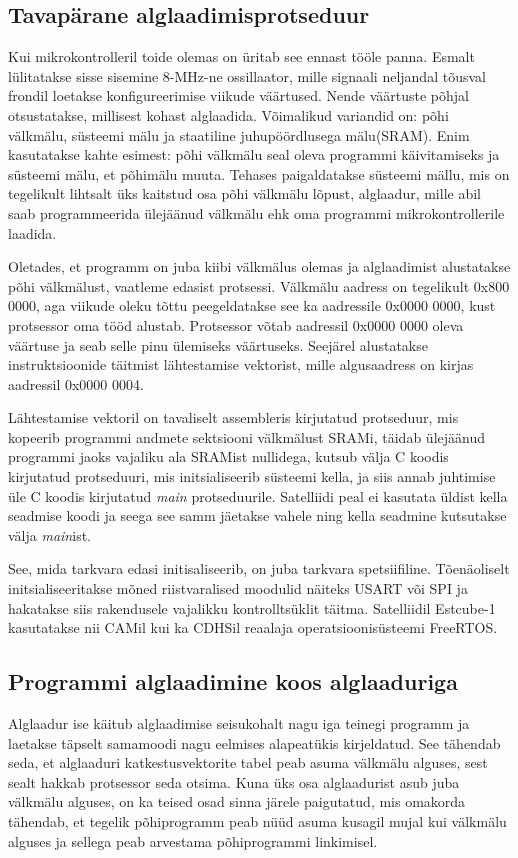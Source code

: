 \documentclass[12pt,a4paper]{article}
\begin{document}
\subsection{Tavapärane alglaadimisprotseduur}
Kui mikrokontrolleril toide olemas on üritab see ennast tööle panna.
Esmalt lülitatakse sisse sisemine 8-MHz-ne ossillaator, mille signaali
neljandal tõusval frondil loetakse konfigureerimise viikude väärtused. Nende
väärtuste põhjal otsustatakse, millisest kohast alglaadida. Võimalikud
variandid on: põhi välkmälu, süsteemi mälu ja staatiline juhupöördlusega
mälu(SRAM).  Enim kasutatakse kahte esimest: põhi välkmälu seal oleva programmi
käivitamiseks ja süsteemi mälu, et põhimälu muuta. Tehases paigaldatakse
süsteemi mällu, mis on tegelikult lihtsalt üks kaitstud osa põhi välkmälu
lõpust, alglaadur, mille abil saab programmeerida ülejäänud välkmälu ehk oma
programmi mikrokontrollerile laadida.

Oletades, et programm on juba kiibi välkmälus olemas ja alglaadimist
alustatakse põhi välkmälust, vaatleme edasist protsessi. Välkmälu aadress on
tegelikult 0x800 0000, aga viikude oleku tõttu peegeldatakse see ka aadressile
0x0000 0000, kust protsessor oma tööd alustab.  Protsessor võtab aadressil
0x0000 0000 oleva väärtuse ja seab selle pinu ülemiseks väärtuseks. Seejärel
alustatakse instruktsioonide täitmist lähtestamise vektorist, mille
algusaadress on kirjas aadressil 0x0000 0004. \cite{f1rm}

Lähtestamise vektoril on tavaliselt assembleris kirjutatud protseduur, mis
kopeerib programmi andmete sektsiooni välkmälust SRAMi, täidab ülejäänud
programmi jaoks vajaliku ala SRAMist nullidega, kutsub välja C koodis kirjutatud
protseduuri, mis initsialiseerib süsteemi kella, ja siis annab juhtimise üle C
koodis kirjutatud \textit{main} protseduurile. Satelliidi peal ei kasutata
üldist kella seadmise koodi ja seega see samm jäetakse vahele ning kella
seadmine kutsutakse välja \textit{main}ist.

See, mida tarkvara edasi initisaliseerib, on juba tarkvara spetsiifiline.
Tõenäoliselt initsialiseeritakse mõned riistvaralised moodulid näiteks USART või
SPI ja hakatakse siis rakendusele vajalikku kontrolltsüklit täitma. Satelliidil
Estcube-1 kasutatakse nii CAMil kui ka CDHSil reaalaja operatsioonisüsteemi
FreeRTOS.

\subsection{Programmi alglaadimine koos alglaaduriga}
Alglaadur ise käitub alglaadimise seisukohalt nagu iga teinegi programm ja
laetakse täpselt samamoodi nagu eelmises alapeatükis kirjeldatud. See tähendab
seda, et alglaaduri katkestusvektorite tabel peab asuma välkmälu alguses, sest
sealt hakkab protsessor seda otsima. Kuna üks osa alglaadurist asub juba
välkmälu alguses, on ka teised osad sinna järele paigutatud, mis omakorda
tähendab, et tegelik põhiprogramm peab nüüd asuma kusagil mujal kui välkmälu
alguses ja sellega peab arvestama põhiprogrammi linkimisel.
\end{document}
